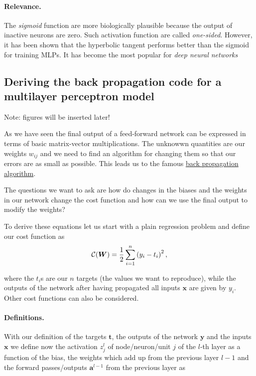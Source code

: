 \documentclass[%
oneside,                 %
final,                   %
10pt]{article}
\begin{document}
\paragraph{Relevance.}
The \emph{sigmoid} function are more biologically plausible because the
output of inactive neurons are zero. Such activation function are
called \emph{one-sided}. However, it has been shown that the hyperbolic
tangent performs better than the sigmoid for training MLPs. It has
become the most popular for \emph{deep neural networks}


\subsection{Deriving the back propagation code for a multilayer perceptron model}

Note: figures will be inserted later!

As we have seen the final output of a feed-forward network can be expressed in terms of basic matrix-vector multiplications.
The unknowwn quantities are our weights $w_{ij}$ and we need to find an algorithm for changing them so that our errors are as small as possible.
This leads us to the famous \href{{https://www.nature.com/articles/323533a0}}{back propagation algorithm}.

The questions we want to ask are how do changes in the biases and the
weights in our network change the cost function and how can we use the
final output to modify the weights?

To derive these equations let us start with a plain regression problem
and define our cost function as
\[
{\cal C}(\boldsymbol{W})  =  \frac{1}{2}\sum_{i=1}^n\left(y_i - t_i\right)^2, 
\]

where the $t_i$s are our $n$ targets (the values we want to
reproduce), while the outputs of the network after having propagated
all inputs $\boldsymbol{x}$ are given by $y_i$.  Other cost functions can also be considered.

\paragraph{Definitions.}
With our definition of the targets $\boldsymbol{t}$, the outputs of the
network $\boldsymbol{y}$ and the inputs $\boldsymbol{x}$ we
define now the activation $z_j^l$ of node/neuron/unit $j$ of the
$l$-th layer as a function of the bias, the weights which add up from
the previous layer $l-1$ and the forward passes/outputs
$\boldsymbol{a}^{l-1}$ from the previous layer as
\end{document}
